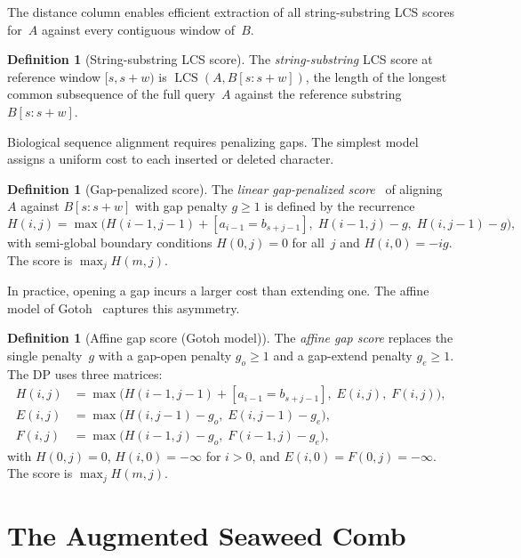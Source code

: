 \documentclass[11pt, a4paper]{article}
\theoremstyle{definition}
\newtheorem{definition}[theorem]{Definition}
\theoremstyle{remark}
\newcommand{\LCS}{\operatorname{LCS}}
\begin{document}
The distance column enables efficient extraction of all
string-substring LCS scores for~$A$ against every contiguous
window of~$B$.

\begin{definition}[String-substring LCS score]
\label{def:ss-lcs}
The \emph{string-substring} LCS score at reference window
$[s, s{+}w)$ is $\LCS(A, B[s{:}s{+}w])$, the length of the
longest common subsequence of the full query~$A$ against the
reference substring $B[s{:}s{+}w]$.
\end{definition}

Biological sequence alignment requires penalizing gaps.  The
simplest model assigns a uniform cost to each inserted or deleted
character.

\begin{definition}[Gap-penalized score]
\label{def:gap-score}
The \emph{linear gap-penalized score}~\cite{smith1981identification,needleman1970general}
of aligning $A$ against $B[s{:}s{+}w]$ with gap penalty
$g \ge 1$ is defined by the recurrence
\[
  H(i, j) = \max\!\bigl(
    H(i{-}1, j{-}1) + [a_{i-1} = b_{s+j-1}],\;
    H(i{-}1, j) - g,\;
    H(i, j{-}1) - g
  \bigr),
\]
with semi-global boundary conditions $H(0, j) = 0$ for all~$j$
and $H(i, 0) = -ig$.
The score is $\max_j H(m, j)$.
\end{definition}

In practice, opening a gap incurs a larger cost than extending
one.
The affine model of Gotoh~\cite{gotoh1982improved}
captures this asymmetry.

\begin{definition}[Affine gap score (Gotoh model)]
\label{def:affine-gap}
The \emph{affine gap score} replaces the single penalty~$g$
with a gap-open penalty $g_o \geq 1$ and a gap-extend
penalty $g_e \geq 1$.
The DP uses three matrices:
\begin{align*}
  H(i,j) &= \max\!\bigl(
    H(i{-}1, j{-}1) + [a_{i-1} = b_{s+j-1}],\;
    E(i,j),\; F(i,j)\bigr), \\
  E(i,j) &= \max\!\bigl(H(i, j{-}1) - g_o,\;
    E(i, j{-}1) - g_e\bigr), \\
  F(i,j) &= \max\!\bigl(H(i{-}1, j) - g_o,\;
    F(i{-}1, j) - g_e\bigr),
\end{align*}
with $H(0,j) = 0$, $H(i,0) = -\infty$ for $i > 0$, and
$E(i,0) = F(0,j) = -\infty$.
The score is $\max_j H(m, j)$.
\end{definition}

\section{The Augmented Seaweed Comb}\label{sec:augmented}
\end{document}
